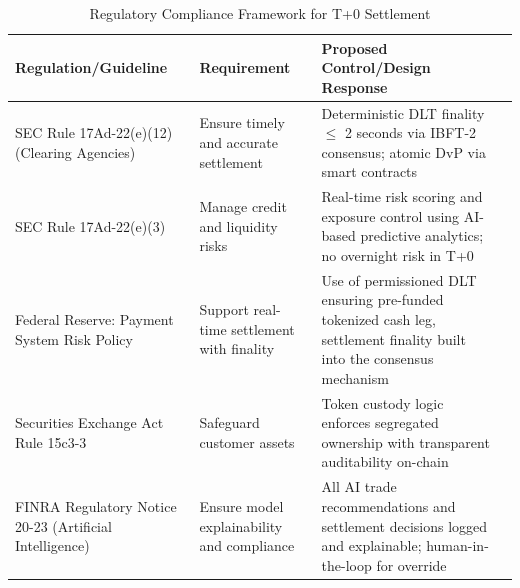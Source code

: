\documentclass[conference]{IEEEtran}
\begin{document}
\begin{table}[t]
\centering
\caption{Regulatory Compliance Framework for T+0 Settlement}
\label{tab:regulatory}
\begin{tabular}{@{}>{\RaggedRight}p{3cm}>{\RaggedRight}p{3.5cm}>{\RaggedRight}p{7cm}>{\RaggedRight}p{1.5cm}@{}}
\toprule
\textbf{Regulation/Guideline} & \textbf{Requirement} & \textbf{Proposed Control/Design Response}  \\
\midrule
SEC Rule 17Ad-22(e)(12) (Clearing Agencies) & Ensure timely and accurate settlement & Deterministic DLT finality $\leq$ 2 seconds via IBFT-2 consensus; atomic DvP via smart contracts  \\

SEC Rule 17Ad-22(e)(3) & Manage credit and liquidity risks & Real-time risk scoring and exposure control using AI-based predictive analytics; no overnight risk in T+0  \\

Federal Reserve: Payment System Risk Policy & Support real-time settlement with finality & Use of permissioned DLT ensuring pre-funded tokenized cash leg, settlement finality built into the consensus mechanism \\


Securities Exchange Act Rule 15c3-3 & Safeguard customer assets & Token custody logic enforces segregated ownership with transparent auditability on-chain  \\

FINRA Regulatory Notice 20-23 (Artificial Intelligence) & Ensure model explainability and compliance & All AI trade recommendations and settlement decisions logged and explainable; human-in-the-loop for override  \\
\bottomrule
\end{tabular}
\end{table}
\end{document}
